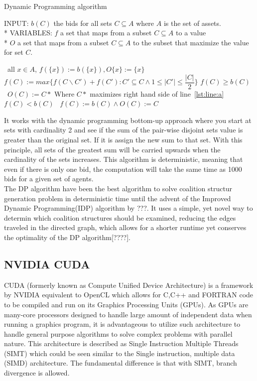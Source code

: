 \documentclass[a4paper, 12pt]{report}
\begin{document}
\begin{algorithm}
\caption{Dynamic Programming algorithm}
INPUT: $b(C)$ the bids for all sets $C \subseteq A$ where $A$ is the set of assets.\\*
VARIABLES: $f$ a set that maps from a subset $C \subseteq A$ to a value\\*
$O$ a set that maps from a subset $C \subseteq A$ to the subset that maximize the value for set $C$.
\begin{algorithmic}[1]
\STATE\algorithmicfor\ all $x \in A$, \algorithmicdo $f(\{x\}):= b(\{x\}),O\{x\}:= \{x\}$ \algorithmicendfor
{}
\STATE $f(C) := max\{f(C\backslash C')+f(C'):C'\subseteq C \wedge 1 \leq \vert C' \vert \leq \dfrac{\vert C \vert}{2}\}$ \label{lst:line:a}
\STATE\algorithmicif $f(C) \geq b(C)$ \algorithmicthen\ $O(C) := C*$ \hfill Where $C*$ maximizes right hand side of line~\ref{lst:line:a} \algorithmicendif
\STATE\algorithmicif $f(C) < b(C)$ \algorithmicthen\ $f(C) := b(C)\wedge O(C) := C$ \algorithmicendif
\ENDFOR
\ENDFOR
\end{algorithmic}
\end{algorithm}

It works with the dynamic programming bottom-up approach where you start at sets with cardinality 2 and see if the sum of the pair-wise disjoint sets value is greater than the original set. If it is assign the new sum to that set. With this principle, all sets of the greatest sum will be carried upwards when the cardinality of the sets increases. This algorithm is deterministic, meaning that even if there is only one bid, the computation will take the same time as 1000 bids for a given set of agents. \\
The DP algorithm have been the best algorithm to solve coalition structur generation problem in deterministic time until the advent of the Improved Dynamic Programming(IDP) algorithm by ???. It uses a simple, yet novel way to determin which coalition structures should be examined, reducing the edges traveled in the directed graph, which allows for a shorter runtime yet conserves the optimality of the DP algorithm[????].  

\subsection{NVIDIA CUDA}
CUDA (formerly known as Compute Unified Device Architecture) is a framework by NVIDIA equivalent to OpenCL which allows for C,C++ and FORTRAN code to be compiled and run on its Graphics Processing Units (GPUs). As GPUs are many-core processors designed to handle large amount of independent data when running a graphics program, it is advantageous to utilize such architecture to handle general purpose algorithms to solve complex problems with parallel nature. This architecture is described as Single Instruction Multiple Threads (SIMT) which could be seen similar to the Single instruction, multiple data (SIMD) architecture. The fundamental difference is that with SIMT, branch divergence is allowed.
\end{document}

